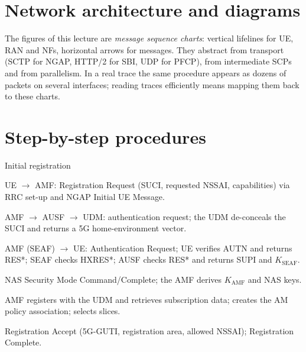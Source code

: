 \documentclass[11pt,a4paper]{article}
\begin{document}
\section{Network architecture and diagrams}
The figures of this lecture are \emph{message sequence charts}: vertical lifelines for UE, RAN and NFs, horizontal arrows for messages.
They abstract from transport (SCTP for NGAP, HTTP/2 for SBI, UDP for PFCP), from intermediate SCPs and from parallelism. In a real trace the
same procedure appears as dozens of packets on several interfaces; reading traces efficiently means mapping them back to these charts.

\section{Step-by-step procedures}

\begin{procedurebox}{Initial registration}\label{proc:reg}
\begin{steps}
  \item UE $\to$ AMF: Registration Request (SUCI, requested NSSAI, capabilities) via RRC set-up and NGAP Initial UE Message.
  \item AMF $\to$ AUSF $\to$ UDM: authentication request; the UDM de-conceals the SUCI and returns a 5G home-environment vector.
  \item AMF (SEAF) $\to$ UE: Authentication Request; UE verifies AUTN and returns RES*; SEAF checks HXRES*; AUSF checks RES* and returns
        SUPI and $K_{\mathrm{SEAF}}$.
  \item NAS Security Mode Command/Complete; the AMF derives $K_{\mathrm{AMF}}$ and NAS keys.
  \item AMF registers with the UDM and retrieves subscription data; creates the AM policy association; selects slices.
  \item Registration Accept (5G-GUTI, registration area, allowed NSSAI); Registration Complete.
\end{steps}
\end{procedurebox}
\end{document}

